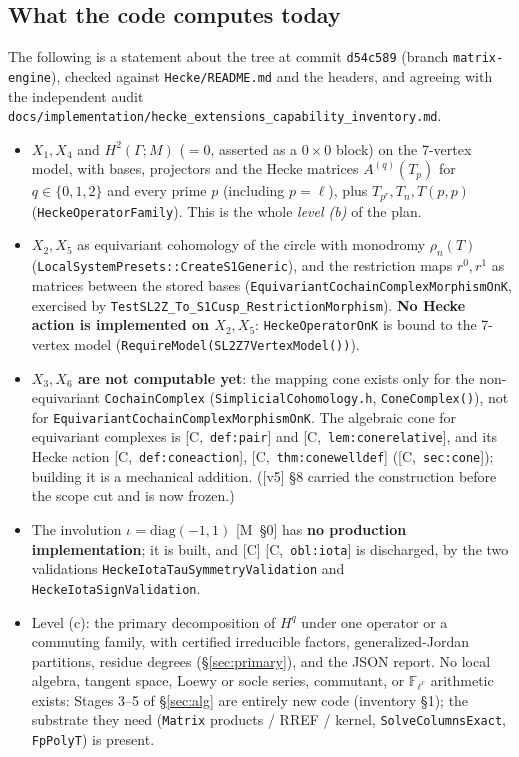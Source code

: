 \documentclass[11pt]{article}
\theoremstyle{remark}
\newcommand{\F}{\mathbb{F}}
\newcommand{\Ga}{\Gamma}
\newcommand{\Flr}{\F_{\ell^r}}
\newcommand{\HA}[1]{[C,~\texttt{#1}]}      %
\newcommand{\Mnote}[1]{[M~\S#1]}            %
\begin{document}
\subsection{What the code computes today}\label{sec:today}
The following is a statement about the tree at commit \texttt{d54c589} (branch
\texttt{matrix-engine}), checked against \texttt{Hecke/README.md} and the headers, and agreeing
with the independent audit \texttt{docs/implementation/\allowbreak hecke\_extensions\_\allowbreak capability\_inventory.md}.
\begin{itemize}
\item $X_1,X_4$ and $H^2(\Ga;M)$ ($=0$, asserted as a $0\times0$ block) on the 7-vertex model,
  with bases, projectors and the Hecke matrices $A^{(q)}(T_p)$ for $q\in\{0,1,2\}$ and every
  prime $p$ (including $p=\ell$), plus $T_{p^r},T_n,T(p,p)$ (\texttt{HeckeOperatorFamily}).
  This is the whole \emph{level (b)} of the plan.
\item $X_2,X_5$ as equivariant cohomology of the circle with monodromy $\rho_n(T)$
  (\texttt{LocalSystemPresets::\allowbreak CreateS1Generic}), and the restriction maps $r^0,r^1$ as
  matrices between the stored bases (\texttt{Equivariant\allowbreak Cochain\allowbreak Complex\allowbreak Morphism\allowbreak OnK}, exercised
  by \texttt{Test\allowbreak SL2Z\_\allowbreak To\_\allowbreak S1Cusp\_\allowbreak Restriction\allowbreak Morphism}). \textbf{No Hecke action is implemented
  on $X_2,X_5$}: \texttt{HeckeOperatorOnK} is bound to the 7-vertex model
  (\texttt{RequireModel(\allowbreak SL2Z7VertexModel())}).
\item \textbf{$X_3,X_6$ are not computable yet}: the mapping cone exists only for the
  non-equivariant \texttt{CochainComplex} (\texttt{Simplicial\allowbreak Cohomology.h},
  \texttt{Cone\allowbreak Complex()}), not for \texttt{Equivariant\allowbreak Cochain\allowbreak Complex\allowbreak Morphism\allowbreak OnK}. The algebraic
  cone for equivariant complexes is \HA{def:pair} and \HA{lem:conerelative}, and its Hecke
  action \HA{def:coneaction}, \HA{thm:conewelldef} (\HA{sec:cone}); building it is a mechanical
  addition. ([v5] \S8 carried the construction before the scope cut and is now frozen.)
\item The involution $\iota=\mathrm{diag}(-1,1)$ \Mnote{0} has \textbf{no production
  implementation}; it is built, and [C] \HA{obl:iota} is discharged, by the two validations
  \texttt{HeckeIotaTauSymmetryValidation} and \texttt{HeckeIotaSignValidation}.
\item Level (c): the primary decomposition of $H^q$ under one operator or a commuting family,
  with certified irreducible factors, generalized-Jordan partitions, residue degrees
  (\S\ref{sec:primary}), and the JSON report. No local algebra, tangent space, Loewy or socle
  series, commutant, or $\Flr$ arithmetic exists: Stages 3--5 of \S\ref{sec:alg} are entirely new
code (inventory \S1); the substrate they need (\texttt{Matrix} products / RREF / kernel,
\texttt{SolveColumnsExact}, \texttt{FpPolyT}) is present.
\end{itemize}
\end{document}
